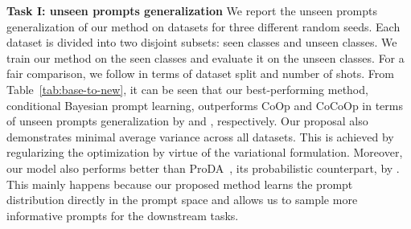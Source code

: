 \documentclass[10pt,twocolumn,letterpaper]{article}
\newcommand{\coop}{CoOp } \newcommand{\coopvpt}{CoOp+VPT } \newcommand{\cocoop}{CoCoOp } \newcommand{\cocoopvpt}{CoCoOp+VPT }
\begin{document}
\textbf{Task I: unseen prompts generalization} 
We report the unseen prompts generalization of our method on  datasets for three different random seeds. Each dataset is divided into two disjoint subsets: seen classes and unseen classes. We train our method on the seen classes and evaluate it on the unseen classes. For a fair comparison, we follow \cite{zhou2022learning, zhou2022conditional} in terms of dataset split and number of shots. From Table~\ref{tab:base-to-new}, it can be seen that our best-performing method, conditional Bayesian prompt learning, outperforms \coop and \cocoop in terms of unseen prompts generalization by  and , respectively. 
Our proposal also demonstrates minimal average variance across all datasets. This is achieved by regularizing the optimization by virtue of the variational formulation. Moreover, our model also performs better than ProDA~\cite{lu2022prompt}, its probabilistic counterpart, by . This mainly happens because our proposed method learns the prompt distribution directly in the prompt space and allows us to sample more informative prompts for the downstream tasks.
\end{document}
